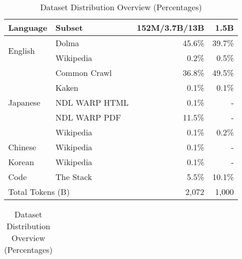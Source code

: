 \begin{table}[t]
\caption{Dataset Distribution Overview (Percentages)}
\label{tab:dataset-distribution}
\centering
\small
\begin{tabular}{llrr}
\toprule
Language & Subset & 152M/3.7B/13B & 1.5B \\
\midrule
\multirow{2}{*}{English} & Dolma & 45.6\% & 39.7\% \\
& Wikipedia & 0.2\% & 0.5\% \\
\midrule
\multirow{5}{*}{Japanese} & Common Crawl & 36.8\% & 49.5\% 
 \\
& Kaken & 0.1\% & 0.1\% \\
& NDL WARP HTML & 0.1\% & -  \\
& NDL WARP PDF & 11.5\% & -  \\
& Wikipedia & 0.1\% & 0.2\%  \\
\midrule
Chinese & Wikipedia & 0.1\% & - \\
\midrule
Korean & Wikipedia & 0.1\% & -  \\
\midrule
Code & The Stack & 5.5\% & 10.1\%  \\
\midrule
\multicolumn{2}{l}{Total Tokens (B)} & 2,072 & 1,000 \\
\bottomrule
\end{tabular}
\begin{tabular}{@{}p{\linewidth}@{}}

\end{tabular}
\end{table}






